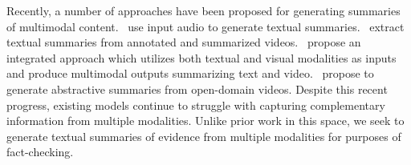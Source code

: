 Recently, a number of approaches have been proposed for generating summaries of multimodal content.~\citet{111_inproceedings} use input audio to generate textual summaries.~\citet{7926698} extract textual summaries from annotated and summarized videos.~\citet{article,zhu-etal-2018-msmo} propose an integrated approach which utilizes both textual and visual modalities as inputs and produce multimodal outputs summarizing text and video.~\citet{palaskar-etal-2019-multimodal} propose to generate abstractive summaries from open-domain videos. Despite this recent progress, existing models continue to struggle with capturing complementary information from multiple modalities. Unlike prior work in this space, we seek to generate textual summaries of evidence from multiple modalities for purposes of fact-checking.
